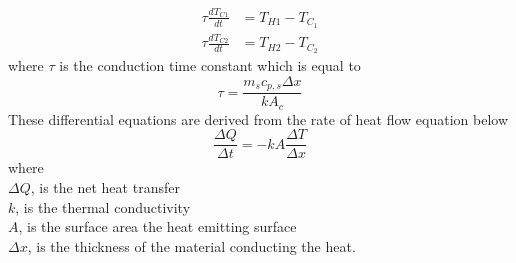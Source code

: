 \begin{align}
    \tau \frac{d T_{C 1}}{d t} &= T_{H 1}-T_{C_{1}} \label{eq:nonlin3}\\ 
    \tau \frac{d T_{C 2}}{d t} &= T_{H 2}-T_{C_{2}} \label{eq:nonlin4}
\end{align}
where $\tau$ is the conduction time constant which is equal to 
$$
\tau = \frac{m_{s} c_{p, s} \Delta x}{k A_{c}}
$$
These differential equations are derived from the rate of heat flow equation below
$$
\frac{\Delta Q}{\Delta t}=-k A \frac{\Delta T}{\Delta x}
$$
where \\
$\Delta Q$, is the net heat transfer\\
$k$, is the thermal conductivity\\
$A$, is the surface area the heat emitting surface\\
$\Delta x$, is the thickness of the material conducting the heat.